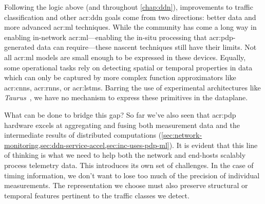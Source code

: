 Following the logic above (and throughout \cref{chap:ddn}), improvements to traffic classification and other \gls{acr:ddn} goals come from two directions: better data and more advanced \gls{acr:ml} techniques.
While the community has come a long way in enabling in-network \gls{acr:ml}---enabling the in-situ processing that \gls{acr:pdp}-generated data can require---these nascent techniques still have their limits.
Not all \gls{acr:ml} models are small enough to be expressed in these devices.
Equally, some operational tasks rely on detecting spatial or temporal properties in data which can only be captured by more complex function approximators like \glspl{acr:cnn}, \glspl{acr:rnn}, or \glspl{acr:lstm}.
Barring the use of experimental architectures like \emph{Taurus}~\parencite{DBLP:conf/asplos/SwamyR0GO22}, we have no mechanism to express these primitives in the dataplane.

What can be done to bridge this gap?
So far we've also seen that \gls{acr:pdp} hardware excels at aggregating and fusing both measurement data and the intermediate results of distributed computations (\cref{sec:network-monitoring,sec:ddn-service-accel,sec:inc-uses-pdp-ml}).
It is evident that this line of thinking is what we need to help both the network and end-hosts scalably process telemetry data.
This introduces its own set of challenges.
In the case of timing information, we don't want to lose too much of the precision of individual measurements.
The representation we choose must also preserve structural or temporal features pertinent to the traffic classes we detect.

%
%


